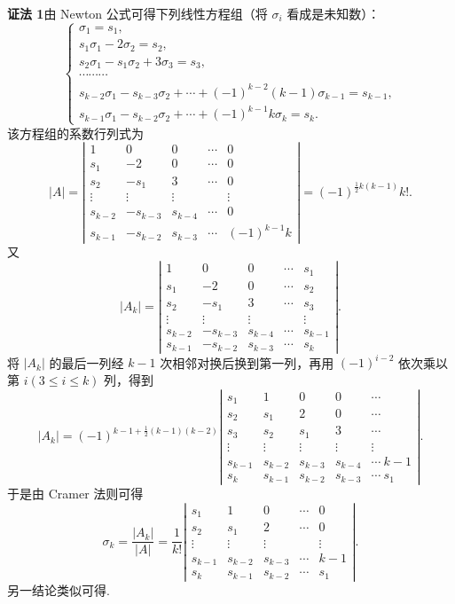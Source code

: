 \documentclass[UTF8,12pt,a4paper,fontset=fandol]{ctexart}
\begin{document}
\noindent\textbf{证法 1}\quad 由 Newton 公式可得下列线性方程组（将 $\sigma_i$ 看成是未知数）：
\[
\left\{
\begin{array}{l}
\sigma_1=s_1,\\
s_1\sigma_1-2\sigma_2=s_2,\\
s_2\sigma_1-s_1\sigma_2+3\sigma_3=s_3,\\
\cdots\cdots\cdots\\
s_{k-2}\sigma_1-s_{k-3}\sigma_2+\cdots+(-1)^{k-2}(k-1)\sigma_{k-1}=s_{k-1},\\
s_{k-1}\sigma_1-s_{k-2}\sigma_2+\cdots+(-1)^{k-1}k\sigma_k=s_k.
\end{array}
\right.
\]
该方程组的系数行列式为
\[
|A|=
\left|\begin{array}{ccccc}
1 & 0 & 0 & \cdots & 0\\
s_1 & -2 & 0 & \cdots & 0\\
s_2 & -s_1 & 3 & \cdots & 0\\
\vdots & \vdots & \vdots &        & \vdots\\
s_{k-2} & -s_{k-3} & s_{k-4} & \cdots & 0\\
s_{k-1} & -s_{k-2} & s_{k-3} & \cdots & (-1)^{k-1}k
\end{array}\right|
=(-1)^{\frac12 k(k-1)}k!.
\]
又
\[
|A_k|=
\left|\begin{array}{ccccc}
1 & 0 & 0 & \cdots & s_1\\
s_1 & -2 & 0 & \cdots & s_2\\
s_2 & -s_1 & 3 & \cdots & s_3\\
\vdots & \vdots & \vdots &        & \vdots\\
s_{k-2} & -s_{k-3} & s_{k-4} & \cdots & s_{k-1}\\
s_{k-1} & -s_{k-2} & s_{k-3} & \cdots & s_k
\end{array}\right|.
\]
将 $|A_k|$ 的最后一列经 $k-1$ 次相邻对换后换到第一列，再用 $(-1)^{i-2}$ 依次乘以第 $i(3\le i\le k)$ 列，得到
\[
|A_k|=(-1)^{k-1+\frac12(k-1)(k-2)}
\left|\begin{array}{ccccc}
s_1 & 1 & 0 & 0 & \cdots\\
s_2 & s_1 & 2 & 0 & \cdots\\
s_3 & s_2 & s_1 & 3 & \cdots\\
\vdots & \vdots & \vdots & \vdots & \vdots\\
s_{k-1} & s_{k-2} & s_{k-3} & s_{k-4} & \cdots\ k-1\\
s_k & s_{k-1} & s_{k-2} & s_{k-3} & \cdots\ s_1
\end{array}\right|.
\]
于是由 Cramer 法则可得
\[
\sigma_k=\frac{|A_k|}{|A|}=\frac1{k!}
\left|\begin{array}{ccccc}
s_1 & 1 & 0 & \cdots & 0\\
s_2 & s_1 & 2 & \cdots & 0\\
\vdots & \vdots & \vdots &        & \vdots\\
s_{k-1} & s_{k-2} & s_{k-3} & \cdots & k-1\\
s_k & s_{k-1} & s_{k-2} & \cdots & s_1
\end{array}\right|.
\]
另一结论类似可得.
\end{document}
